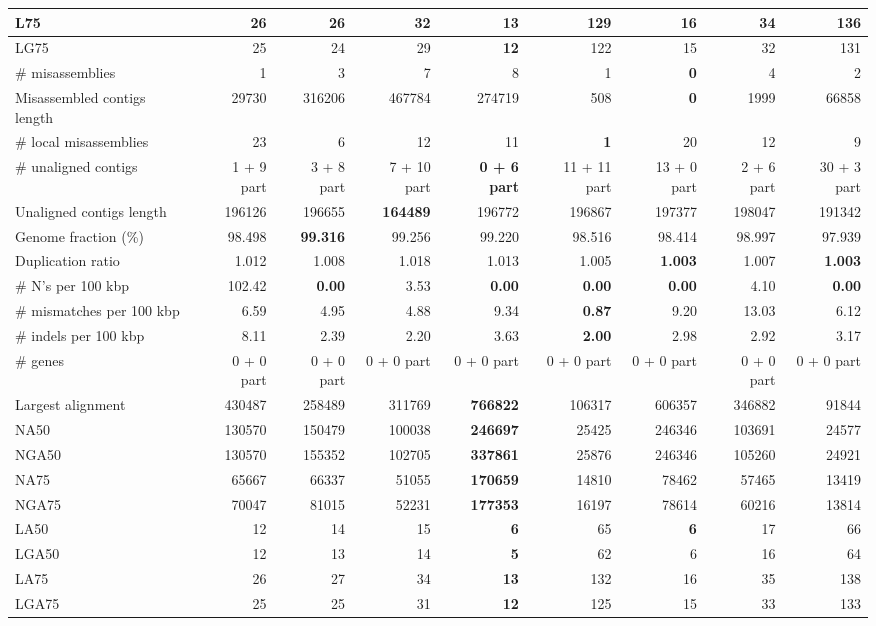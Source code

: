 \documentclass[12pt,a4paper]{article}
\begin{document}
\begin{table}[ht]
\begin{center}
\begin{tabular}{|l*{8}{|r}|}
L75 & 26 & 26 & 32 & {\bf 13} & 129 & 16 & 34 & 136 \\ \hline
LG75 & 25 & 24 & 29 & {\bf 12} & 122 & 15 & 32 & 131 \\ \hline
\# misassemblies & 1 & 3 & 7 & 8 & 1 & {\bf 0} & 4 & 2 \\ \hline
Misassembled contigs length & 29730 & 316206 & 467784 & 274719 & 508 & {\bf 0} & 1999 & 66858 \\ \hline
\# local misassemblies & 23 & 6 & 12 & 11 & {\bf 1} & 20 & 12 & 9 \\ \hline
\# unaligned contigs & 1 + 9 part & 3 + 8 part & 7 + 10 part & {\bf 0 + 6 part} & 11 + 11 part & 13 + 0 part & 2 + 6 part & 30 + 3 part \\ \hline
Unaligned contigs length & 196126 & 196655 & {\bf 164489} & 196772 & 196867 & 197377 & 198047 & 191342 \\ \hline
Genome fraction (\%) & 98.498 & {\bf 99.316} & 99.256 & 99.220 & 98.516 & 98.414 & 98.997 & 97.939 \\ \hline
Duplication ratio & 1.012 & 1.008 & 1.018 & 1.013 & 1.005 & {\bf 1.003} & 1.007 & {\bf 1.003} \\ \hline
\# N's per 100 kbp & 102.42 & {\bf 0.00} & 3.53 & {\bf 0.00} & {\bf 0.00} & {\bf 0.00} & 4.10 & {\bf 0.00} \\ \hline
\# mismatches per 100 kbp & 6.59 & 4.95 & 4.88 & 9.34 & {\bf 0.87} & 9.20 & 13.03 & 6.12 \\ \hline
\# indels per 100 kbp & 8.11 & 2.39 & 2.20 & 3.63 & {\bf 2.00} & 2.98 & 2.92 & 3.17 \\ \hline
\# genes & 0 + 0 part & 0 + 0 part & 0 + 0 part & 0 + 0 part & 0 + 0 part & 0 + 0 part & 0 + 0 part & 0 + 0 part \\ \hline
Largest alignment & 430487 & 258489 & 311769 & {\bf 766822} & 106317 & 606357 & 346882 & 91844 \\ \hline
NA50 & 130570 & 150479 & 100038 & {\bf 246697} & 25425 & 246346 & 103691 & 24577 \\ \hline
NGA50 & 130570 & 155352 & 102705 & {\bf 337861} & 25876 & 246346 & 105260 & 24921 \\ \hline
NA75 & 65667 & 66337 & 51055 & {\bf 170659} & 14810 & 78462 & 57465 & 13419 \\ \hline
NGA75 & 70047 & 81015 & 52231 & {\bf 177353} & 16197 & 78614 & 60216 & 13814 \\ \hline
LA50 & 12 & 14 & 15 & {\bf 6} & 65 & {\bf 6} & 17 & 66 \\ \hline
LGA50 & 12 & 13 & 14 & {\bf 5} & 62 & 6 & 16 & 64 \\ \hline
LA75 & 26 & 27 & 34 & {\bf 13} & 132 & 16 & 35 & 138 \\ \hline
LGA75 & 25 & 25 & 31 & {\bf 12} & 125 & 15 & 33 & 133 \\ \hline
\end{tabular}
\end{center}
\end{table}
\end{document}

